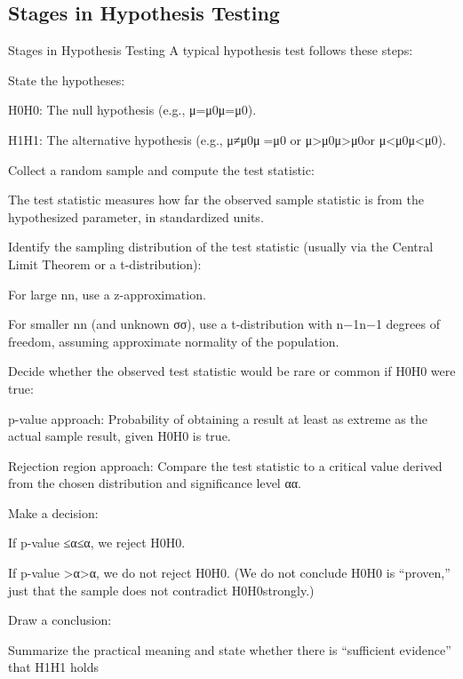 \documentclass[9pt]{extarticle}
\begin{document}
\subsection{Stages in Hypothesis Testing}
\begin{conceptbox}{Stages in Hypothesis Testing}{}
    A typical hypothesis test follows these steps:

    State the hypotheses:

        H0H0​: The null hypothesis (e.g., μ=μ0μ=μ0​).

        H1H1​: The alternative hypothesis (e.g., μ≠μ0μ=μ0​ or μ>μ0μ>μ0​ or μ<μ0μ<μ0​).

    Collect a random sample and compute the test statistic:

        The test statistic measures how far the observed sample statistic is from the hypothesized parameter, in standardized units.

    Identify the sampling distribution of the test statistic (usually via the Central Limit Theorem or a t-distribution):

        For large nn, use a z-approximation.

        For smaller nn (and unknown σσ), use a t-distribution with n−1n−1 degrees of freedom, assuming approximate normality of the population.

    Decide whether the observed test statistic would be rare or common if H0H0​ were true:

        p-value approach: Probability of obtaining a result at least as extreme as the actual sample result, given H0H0​ is true.

        Rejection region approach: Compare the test statistic to a critical value derived from the chosen distribution and significance level αα.

    Make a decision:

        If p-value ≤α≤α, we reject H0H0​.

        If p-value >α>α, we do not reject H0H0​. (We do not conclude H0H0​ is “proven,” just that the sample does not contradict H0H0​ strongly.)

    Draw a conclusion:

        Summarize the practical meaning and state whether there is “sufficient evidence” that H1H1​ holds
\end{conceptbox}
\end{document}
